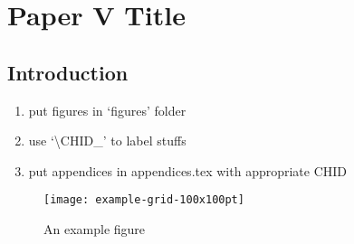 \chapter{Paper V Title}\label{ch:\CHID}

	

\section{Introduction} \label{\CHID_sec:intro}
	\begin{enumerate}
		\item put figures in `figures' folder
		\item use `\textbackslash CHID\_' to label stuffs
		\item put appendices in appendices.tex with appropriate CHID
	\end{enumerate}
	\begin{figure}[h]
		\centering
		\texttt{[image: example-grid-100x100pt]}
		\caption{An example figure}\label{\CHID_fig:exmple_image}
	\end{figure}
